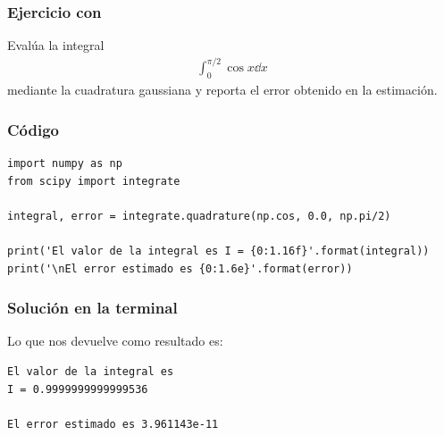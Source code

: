 \begin{frame}
\frametitle{Ejercicio con }
Evalúa la integral
\begin{align*}
\int_{0}^{\pi/2} \cos x \dd{x}
\end{align*}
mediante la cuadratura gaussiana  y reporta el error obtenido en la estimación.
\end{frame}
\begin{frame}
\frametitle{Código}
\begin{lstlisting}[caption=Código para la cuadratura gaussiana, style=FormattedNumber, basicstyle=\linespread{1.1}\ttfamily=\small, columns=fullflexible]
import numpy as np
from scipy import integrate

integral, error = integrate.quadrature(np.cos, 0.0, np.pi/2)

print('El valor de la integral es I = {0:1.16f}'.format(integral))
print('\nEl error estimado es {0:1.6e}'.format(error))
\end{lstlisting}
\end{frame}
\begin{frame}[fragile]
\frametitle{Solución en la terminal}
Lo que nos devuelve como resultado es:
\begin{verbatim}
El valor de la integral es 
I = 0.9999999999999536

El error estimado es 3.961143e-11
\end{verbatim}
\end{frame}
